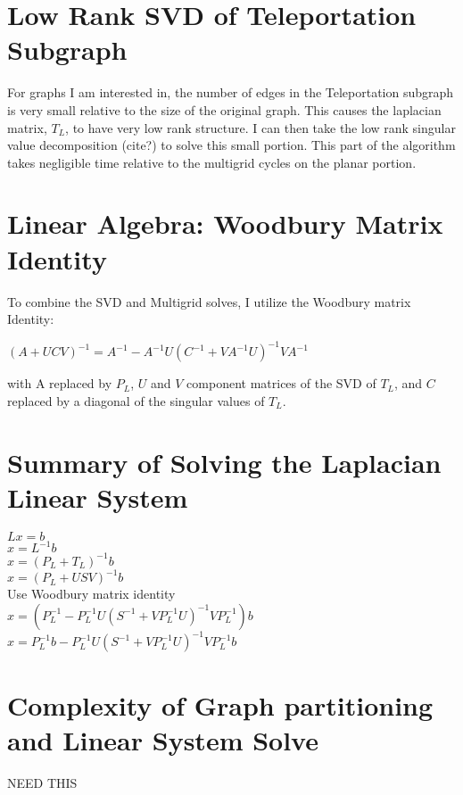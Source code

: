 \documentclass{article}
\begin{document}
\section{Low Rank SVD of Teleportation Subgraph}
For graphs I am interested in, the number of edges in the Teleportation subgraph is very small relative to the size of the original graph. This causes the laplacian matrix, $T_L$, to have very low rank structure. I can then take the low rank singular value decomposition (cite?) to solve this small portion. This part of the algorithm takes negligible time relative to the multigrid cycles on the planar portion.

\section{Linear Algebra: Woodbury Matrix Identity}
To combine the SVD and Multigrid solves, I utilize the Woodbury matrix Identity:\\
\begin{center}
$(A+UCV)^{-1} = A^{-1} - A^{-1}U(C^{-1}+VA^{-1}U)^{-1}VA^{-1}$\\
\end{center}
with A replaced by $P_L$, $U$ and $V$ component matrices of the SVD of $T_L$, and $C$ replaced by a diagonal of the singular values of $T_L$.

\section{Summary of Solving the Laplacian Linear System}
\begin{center}
$Lx=b$\\
$x = L^{-1}b$\\
$x = (P_L+T_L)^{-1}b$\\
$x = (P_L+USV)^{-1}b$\\
Use Woodbury matrix identity\\
$x = (P_L^{-1}-P_L^{-1}U(S^{-1}+VP_L^{-1}U)^{-1}VP_L^{-1})b$\\
$x = P_L^{-1}b-P_L^{-1}U(S^{-1}+VP_L^{-1}U)^{-1}VP_L^{-1}b$\\
\end{center}

\section{Complexity of Graph partitioning and Linear System Solve}
NEED THIS
\end{document}
